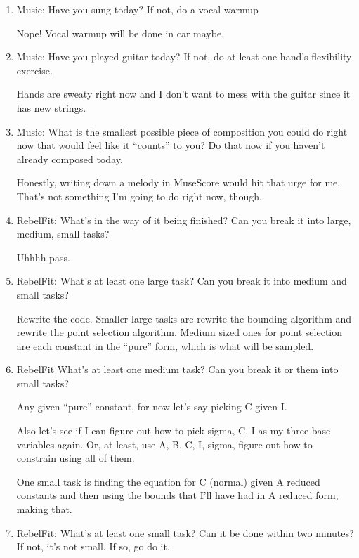 \documentclass[12pt]{article}
\newcommand{\say}[1]{``#1''}
\renewcommand{\,}{\textsuperscript{,}}
\begin{document}
\begin{enumerate}
Let's do that in the template as well.

\item Music: Have you sung today? If not, do a vocal warmup

Nope! Vocal warmup will be done in car maybe.

\item Music: Have you played guitar today? If not, do at least one hand's flexibility exercise.

Hands are sweaty right now and I don't want to mess with the guitar since it has new strings.

\item Music: What is the smallest possible piece of composition you could do right now that would feel like it \say{counts} to you? Do that now if you haven't already composed today.

Honestly, writing down a melody in MuseScore would hit that urge for me. That's not something I'm going to do right now, though.

\item RebelFit: What's in the way of it being finished? Can you break it into large, medium, small tasks?

Uhhhh pass.

\item RebelFit: What's at least one large task? Can you break it into medium and small tasks?

Rewrite the code. Smaller large tasks are rewrite the bounding algorithm and rewrite the point selection algorithm.  
Medium sized ones for point selection are each constant in the \say{pure} form, which is what will be sampled.

\item RebelFit What's at least one medium task? Can you break it or them into small tasks?

Any given \say{pure} constant, for now let's say picking C given I.

Also let's see if I can figure out how to pick sigma, C, I as my three base variables again.  
Or, at least, use A, B, C, I, sigma, figure out how to constrain using all of them.

One small task is finding the equation for C (normal) given A reduced constants and then using the bounds that I'll have had in A reduced form, making that.

\item RebelFit: What's at least one small task? Can it be done within two minutes? If not, it's not small. If so, go do it.


\end{enumerate}
\end{document}
